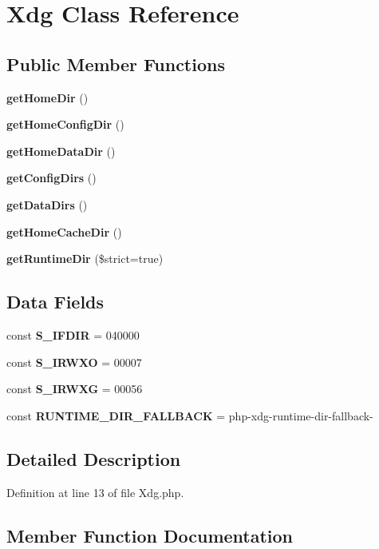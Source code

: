 \section{Xdg Class Reference}
\label{class_xdg_base_dir_1_1_xdg}
\subsection*{Public Member Functions}
\begin{DoxyCompactItemize}
\item 
{\bf get\+Home\+Dir} ()
\item 
{\bf get\+Home\+Config\+Dir} ()
\item 
{\bf get\+Home\+Data\+Dir} ()
\item 
{\bf get\+Config\+Dirs} ()
\item 
{\bf get\+Data\+Dirs} ()
\item 
{\bf get\+Home\+Cache\+Dir} ()
\item 
{\bf get\+Runtime\+Dir} (\$strict=true)
\end{DoxyCompactItemize}
\subsection*{Data Fields}
\begin{DoxyCompactItemize}
\item 
const {\bf S\+\_\+\+I\+F\+D\+I\+R} = 040000
\item 
const {\bf S\+\_\+\+I\+R\+W\+X\+O} = 00007
\item 
const {\bf S\+\_\+\+I\+R\+W\+X\+G} = 00056
\item 
const {\bf R\+U\+N\+T\+I\+M\+E\+\_\+\+D\+I\+R\+\_\+\+F\+A\+L\+L\+B\+A\+C\+K} = \textquotesingle{}php-\/xdg-\/runtime-\/dir-\/fallback-\/\textquotesingle{}
\end{DoxyCompactItemize}


\subsection{Detailed Description}


Definition at line 13 of file Xdg.\+php.



\subsection{Member Function Documentation}
